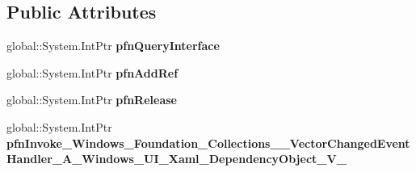 \subsection*{Public Attributes}
\begin{DoxyCompactItemize}
\item 
\mbox{\label{struct_windows_1_1_foundation_1_1_collections_1_1_vector_changed_event_handler___a___windows___ube91dabf53d084dfd6eb7cefa21564f8_a3937bf57992f07bddf0c9e3619c6d438}} 
global\+::\+System.\+Int\+Ptr {\bfseries pfn\+Query\+Interface}
\item 
\mbox{\label{struct_windows_1_1_foundation_1_1_collections_1_1_vector_changed_event_handler___a___windows___ube91dabf53d084dfd6eb7cefa21564f8_af8622ca7fedbb8f851fa8b2cb42e0f65}} 
global\+::\+System.\+Int\+Ptr {\bfseries pfn\+Add\+Ref}
\item 
\mbox{\label{struct_windows_1_1_foundation_1_1_collections_1_1_vector_changed_event_handler___a___windows___ube91dabf53d084dfd6eb7cefa21564f8_ad2594af1c83e16c2fb014b92e176c4a8}} 
global\+::\+System.\+Int\+Ptr {\bfseries pfn\+Release}
\item 
\mbox{\label{struct_windows_1_1_foundation_1_1_collections_1_1_vector_changed_event_handler___a___windows___ube91dabf53d084dfd6eb7cefa21564f8_aa648c53d0d74d77461110e836c0af21b}} 
global\+::\+System.\+Int\+Ptr {\bfseries pfn\+Invoke\+\_\+\+Windows\+\_\+\+Foundation\+\_\+\+Collections\+\_\+\+\_\+\+Vector\+Changed\+Event\+Handler\+\_\+\+A\+\_\+\+Windows\+\_\+\+U\+I\+\_\+\+Xaml\+\_\+\+Dependency\+Object\+\_\+\+V\+\_\+}
\end{DoxyCompactItemize}
